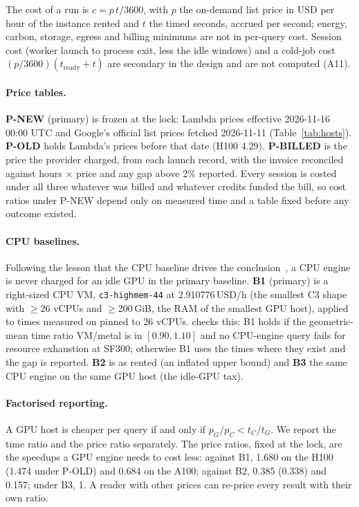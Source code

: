 \documentclass[sigconf]{acmart}
\begin{document}
The cost of a run is $c = p\,t/3600$, with $p$ the on-demand list price in USD per hour of the
instance rented and $t$ the timed seconds, accrued per second; energy, carbon, storage, egress
and billing minimums are not in per-query cost. Session cost (worker launch to process exit,
less the idle windows) and a cold-job cost $(p/3600)(t_{\mathrm{ready}} + t)$ are secondary in the
design and are not computed (A11).

\paragraph{Price tables.}
\textbf{P-NEW} (primary) is frozen at the lock: Lambda prices effective 2026-11-16 00:00 UTC
and Google's official list prices fetched 2026-11-11 (Table~\ref{tab:hosts}). \textbf{P-OLD}
holds Lambda's prices before that date (H100 4.29). \textbf{P-BILLED} is the price the provider
charged, from each launch record, with the invoice reconciled against hours $\times$ price and
any gap above 2\% reported. Every session is costed under all three whatever was billed and
whatever credits funded the bill, so cost ratios under P-NEW depend only on measured time and a
table fixed before any outcome existed.

\paragraph{CPU baselines.}
Following the lesson that the CPU baseline drives the conclusion~\cite{lee2010debunking,ejiofor2026p2},
a CPU engine is never charged for an idle GPU in the primary baseline. \textbf{B1} (primary) is
a right-sized CPU VM, \texttt{c3-highmem-44} at 2.910776\,USD/h (the smallest C3 shape with
$\ge$26 vCPUs and $\ge$200\,GiB, the RAM of the smallest GPU host), applied to times measured on
\CG{} pinned to 26 vCPUs. \CV{} checks this: B1 holds if the geometric-mean time ratio
VM/metal is in $[0.90, 1.10]$ and no CPU-engine query fails for resource exhaustion at SF300;
otherwise B1 uses the \CV{} times where they exist and the gap is reported.
\textbf{B2} is \CG{} as rented (an inflated upper bound) and \textbf{B3} the same CPU engine on
the same GPU host (the idle-GPU tax).

\paragraph{Factorised reporting.}
A GPU host is cheaper per query if and only if $p_G/p_C < t_C/t_G$. We report the time ratio and the price ratio separately. The
price ratios, fixed at the lock, are the speedups a GPU engine needs to cost less: against B1,
1.680 on the H100 (1.474 under P-OLD) and 0.684 on the A100; against B2, 0.385 (0.338) and 0.157;
under B3, 1. A reader with other prices can re-price every result with their own ratio.
\end{document}
